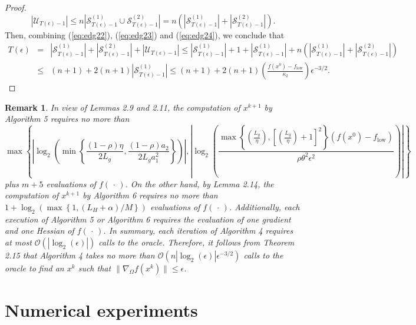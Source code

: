 \documentclass[11pt]{article}
\newtheorem{remark}[theorem]{Remark}
\begin{document}
\begin{proof}
\begin{equation}
\left|\mathcal{U}_{T(\epsilon)-1}\right|\leq n\left|\mathcal{S}_{T(\epsilon)-1}^{(1)}\cup\mathcal{S}_{T(\epsilon)-1}^{(2)}\right|=n\left(\left|\mathcal{S}_{T(\epsilon)-1}^{(1)}\right|+\left|\mathcal{S}_{T(\epsilon)-1}^{(2)}\right|\right).
\label{eq:edg24}
\end{equation}
Then, combining (\ref{eq:edg22}), (\ref{eq:edg23}) and (\ref{eq:edg24}), we conclude that
\small
\begin{eqnarray*}
    T(\epsilon)&=&\left|\mathcal{S}_{T(\epsilon)-1}^{(1)}\right|+\left|\mathcal{S}_{T(\epsilon)-1}^{(2)}\right|+\left|\mathcal{U}_{T(\epsilon)-1}\right|\leq \left|\mathcal{S}_{T(\epsilon)-1}^{(1)}\right|+1+\left|\mathcal{S}^{(1)}_{T(\epsilon)-1}\right|+n\left(\left|\mathcal{S}_{T(\epsilon)-1}^{(1)}\right|+\left|\mathcal{S}_{T(\epsilon)-1}^{(2)}\right|\right)\\
    &\leq & (n+1)+2(n+1)\left|\mathcal{S}_{T(\epsilon)-1}^{(1)}\right|\leq (n+1)+2(n+1)\left(\frac{f(x^{0})-f_{\mathrm{low}}}{\kappa_{2}}\right)\epsilon^{-3/2}.
\end{eqnarray*}
\end{proof}
\normalsize
\begin{remark}
In view of Lemmas 2.9 and 2.11, the computation of $x^{k+1}$ by Algorithm 5 requires no more than
\scriptsize
\[
\max\left\{\left|\log_{2}\left(\min\left\{\frac{(1-\rho)\eta}{2L_{g}},\frac{(1-\rho)a_{2}}{2L_{g}a_{1}^{2}}\right\}\right)\right|,\left|\log_{2}\left(\frac{\max\left\{\left(\frac{L_{g}}{\eta}\right),\left[\left(\frac{L_{g}}{\eta}\right)+1\right]^{2}\right\}(f(x^{0})-f_{\mathrm{low}})}{\rho\theta^{2}\epsilon^{2}}\right)\right|\right\}
\]
\normalsize
plus $m+5$ evaluations of $f(\,\cdot\,)$. On the other hand, by Lemma 2.14, the computation of $x^{k+1}$ by Algorithm 6 requires no more than $1+\log_{2}\left(\max\left\{1,(L_{H}+\alpha) / M\right\}\right)$ evaluations of $f(\,\cdot\,)$. Additionally, each execution of Algorithm 5 or Algorithm 6 requires the evaluation of one gradient and one Hessian of $f(\,\cdot\,)$. In summary, each iteration of Algorithm 4 requires at most $\mathcal{O}\left(|\log_{2}(\epsilon)|\right)$ calls to the oracle. Therefore, it follows from Theorem 2.15 that Algorithm 4 takes no more than $\mathcal{O}\left(n|\log_{2}(\epsilon)|\epsilon^{-3/2}\right)$ calls to the oracle to find an $x^{k}$ such that $\|\nabla_{\Omega}f(x^{k})\|\leq\epsilon$.
\end{remark}


\section{Numerical experiments} \label{sec3}
\end{document}
